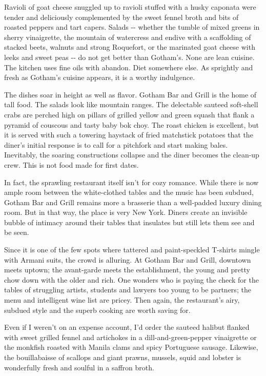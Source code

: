 Ravioli of goat cheese snuggled up to ravioli stuffed with a husky
caponata were tender and deliciously complemented by the sweet fennel
broth and bits of roasted peppers and tart capers. Salads -\/- whether
the tumble of mixed greens in sherry vinaigrette, the mountain of
watercress and endive with a scaffolding of stacked beets, walnuts and
strong Roquefort, or the marinated goat cheese with leeks and sweet peas
-\/- do not get better than Gotham's. None are lean cuisine. The kitchen
uses fine oils with abandon. Diet somewhere else. As sprightly and fresh
as Gotham's cuisine appears, it is a worthy indulgence.

The dishes soar in height as well as flavor. Gotham Bar and Grill is the
home of tall food. The salads look like mountain ranges. The delectable
sauteed soft-shell crabs are perched high on pillars of grilled yellow
and green squash that flank a pyramid of couscous and tasty baby bok
choy. The roast chicken is excellent, but it is served with such a
towering haystack of fried matchstick potatoes that the diner's initial
response is to call for a pitchfork and start making bales. Inevitably,
the soaring constructions collapse and the diner becomes the clean-up
crew. This is not food made for first dates.

In fact, the sprawling restaurant itself isn't for cozy romance. While
there is now ample room between the white-clothed tables and the music
has been subdued, Gotham Bar and Grill remains more a brasserie than a
well-padded luxury dining room. But in that way, the place is very New
York. Diners create an invisible bubble of intimacy around their tables
that insulates but still lets them see and be seen.

Since it is one of the few spots where tattered and paint-speckled
T-shirts mingle with Armani suits, the crowd is alluring. At Gotham Bar
and Grill, downtown meets uptown; the avant-garde meets the
establishment, the young and pretty chow down with the older and rich.
One wonders who is paying the check for the tables of struggling
artists, students and lawyers too young to be partners; the menu and
intelligent wine list are pricey. Then again, the restaurant's airy,
subdued style and the superb cooking are worth saving for.

Even if I weren't on an expense account, I'd order the sauteed halibut
flanked with sweet grilled fennel and artichokes in a
dill-and-green-pepper vinaigrette or the monkfish roasted with Manila
clams and spicy Portuguese sausage. Likewise, the bouillabaisse of
scallops and giant prawns, mussels, squid and lobster is wonderfully
fresh and soulful in a saffron broth.

